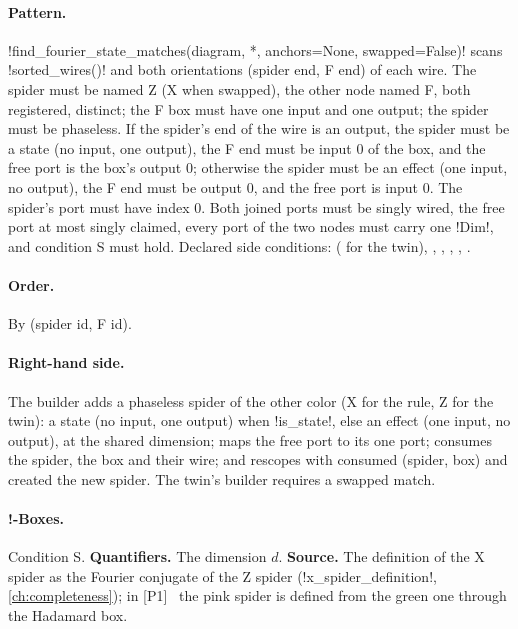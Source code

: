 \paragraph{Pattern.} \py!find_fourier_state_matches(diagram, *, anchors=None, swapped=False)! scans \py!sorted_wires()! and both orientations (spider end, F end) of each wire. The spider must be named Z (X when swapped), the other node named F, both registered, distinct; the F box must have one input and one output; the spider must be phaseless. If the spider's end of the wire is an output, the spider must be a state (no input, one output), the F end must be input 0 of the box, and the free port is the box's output 0; otherwise the spider must be an effect (one input, no output), the F end must be output 0, and the free port is input 0. The spider's port must have index 0. Both joined ports must be singly wired, the free port at most singly claimed, every port of the two nodes must carry one \py!Dim!, and condition S must hold. Declared side conditions:  ( for the twin), , , , , .

\paragraph{Order.} By (spider id, F id).

\paragraph{Right-hand side.} The builder adds a phaseless spider of the other color (X for the rule, Z for the twin): a state (no input, one output) when \py!is_state!, else an effect (one input, no output), at the shared dimension; maps the free port to its one port; consumes the spider, the box and their wire; and rescopes with consumed (spider, box) and created the new spider. The twin's builder requires a swapped match.

\paragraph{!-Boxes.} Condition S. \textbf{Quantifiers.} The dimension $d$. \textbf{Source.} The definition of the X spider as the Fourier conjugate of the Z spider (\py!x_spider_definition!, \cref{ch:completeness}); in [P1]~\cite{poor2023zxw} the pink spider is defined from the green one through the Hadamard box.

